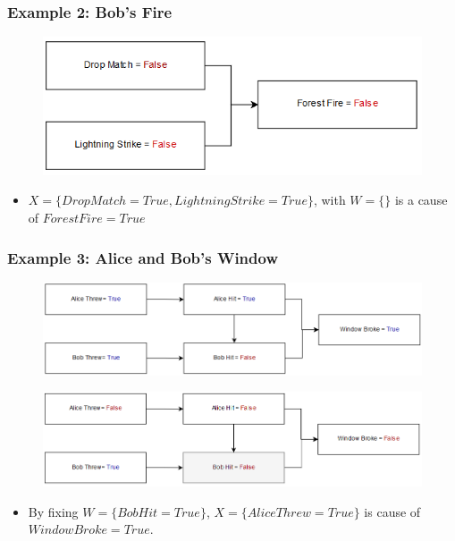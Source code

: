 \documentclass{beamer}
\theoremstyle{plain}
\theoremstyle{definition}
\begin{document}
\begin{frame}
\frametitle{Example 2: Bob's Fire}
\begin{figure}
\includegraphics[scale=.5]{bobModelCounterFactual2}
\end{figure}

\begin{itemize}
\item $X=\{Drop Match=True, Lightning Strike = True\}$, with $W=\{\}$ is a cause of $Forest Fire = True$
\end{itemize}
\end{frame}


\begin{frame}
\frametitle{Example 3: Alice and Bob's Window}
\begin{figure}
\includegraphics[scale=.40]{alicebobModelReal}
\end{figure}

\begin{figure}
\includegraphics[scale=.40]{alicebobModelCounterfactual3}
\end{figure}

\begin{itemize}
\item By fixing $W=\{Bob Hit = True\}$, $X=\{Alice Threw = True\}$ is cause of $Window Broke = True$.
\end{itemize}
\end{frame}
\end{document}
